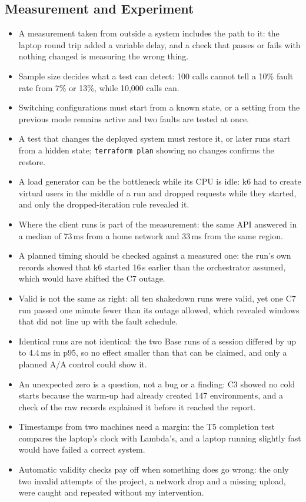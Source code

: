\documentclass[10pt]{article}
\begin{document}
\subsection{Measurement and Experiment}
\begin{itemize}
  \item A measurement taken from outside a system includes the path to it: the
  laptop round trip added a variable delay, and a check that passes or fails
  with nothing changed is measuring the wrong thing.
  \item Sample size decides what a test can detect: 100 calls cannot tell a
  10\% fault rate from 7\% or 13\%, while 10{,}000 calls can.
  \item Switching configurations must start from a known state, or a setting
  from the previous mode remains active and two faults are tested at once.
  \item A test that changes the deployed system must restore it, or later
  runs start from a hidden state; \texttt{terraform plan} showing no changes
  confirms the restore.
  \item A load generator can be the bottleneck while its CPU is idle: k6 had
  to create virtual users in the middle of a run and dropped requests while
  they started, and only the dropped-iteration rule revealed it.
  \item Where the client runs is part of the measurement: the same API
  answered in a median of 73\,ms from a home network and 33\,ms from the same
  region.
  \item A planned timing should be checked against a measured one: the run's
  own records showed that k6 started 16\,s earlier than the orchestrator
  assumed, which would have shifted the C7 outage.
  \item Valid is not the same as right: all ten shakedown runs were valid, yet
  one C7 run passed one minute fewer than its outage allowed, which revealed
  windows that did not line up with the fault schedule.
  \item Identical runs are not identical: the two Base runs of a session
  differed by up to 4.4\,ms in p95, so no effect smaller than that can be
  claimed, and only a planned A/A control could show it.
  \item An unexpected zero is a question, not a bug or a finding: C3 showed no
  cold starts because the warm-up had already created 147 environments, and a
  check of the raw records explained it before it reached the report.
  \item Timestamps from two machines need a margin: the T5 completion test
  compares the laptop's clock with Lambda's, and a laptop running slightly fast
  would have failed a correct system.
  \item Automatic validity checks pay off when something does go wrong: the
  only two invalid attempts of the project, a network drop and a missing
  upload, were caught and repeated without my intervention.
\end{itemize}
\end{document}
